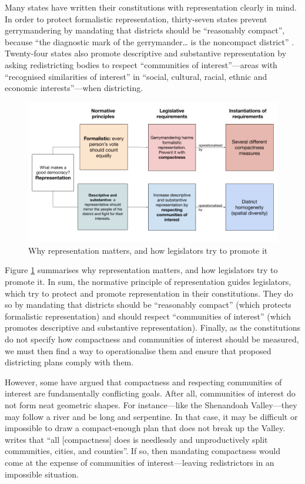\documentclass[]{article}
\begin{document}
Many states have written their constitutions with representation clearly
in mind. In order to protect formalistic representation, thirty-seven
states prevent gerrymandering by mandating that districts should be
``reasonably compact'', because ``the diagnostic mark of the
gerrymander\ldots{} is the noncompact district'' \citep{pp1991}.
Twenty-four states also promote descriptive and substantive
representation by asking redistricting bodies to respect ``communities
of interest''---areas with ``recognised similarities of interest'' in
``social, cultural, racial, ethnic and economic interests''---when
districting.

\begin{figure}
\centering
\includegraphics{./img/why_compactness_and_community1.png}
\caption{Why representation matters, and how legislators try to promote
it\label{flowchart}}
\end{figure}

Figure \ref{flowchart} summarises why representation matters, and how
legislators try to promote it. In sum, the normative principle of
representation guides legislators, which try to protect and promote
representation in their constitutions. They do so by mandating that
districts should be ``reasonably compact'' (which protects formalistic
representation) and should respect ``communities of interest'' (which
promotes descriptive and substantive representation). Finally, as the
constitutions do not specify how compactness and communities of interest
should be measured, we must then find a way to operationalise them and
ensure that proposed districting plans comply with them.

However, some have argued that compactness and respecting communities of
interest are fundamentally conflicting goals. After all, communities of
interest do not form neat geometric shapes. For instance---like the
Shenandoah Valley---they may follow a river and be long and serpentine.
In that case, it may be difficult or impossible to draw a compact-enough
plan that does not break up the Valley. \citeauthor{wolf2015} writes
that ``all {[}compactness{]} does is needlessly and unproductively split
communities, cities, and counties''. If so, then mandating compactness
would come at the expense of communities of interest---leaving
redistrictors in an impossible situation.
\end{document}
